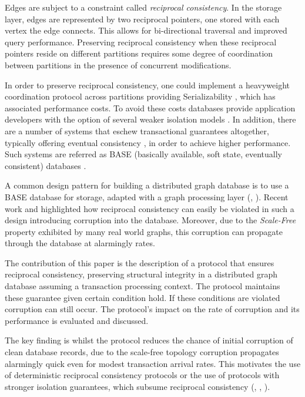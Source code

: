 \documentclass[sigplan,10pt]{acmart}
\begin{document}
Edges are subject to a constraint called \emph{reciprocal consistency}. In the storage layer, edges are represented by two reciprocal pointers, one stored with each vertex the edge connects. This allows for bi-directional traversal and improved query performance. Preserving reciprocal consistency when these reciprocal pointers reside on different partitions requires some degree of coordination between partitions in the presence of concurrent modifications.

In order to preserve reciprocal consistency, one could implement a heavyweight coordination protocol across partitions providing Serializability \cite{Bernstein1987}, which has associated performance costs. To avoid these costs databases provide application developers with the option of several weaker isolation models \cite{Berenson1995}. In addition, there are a number of systems that eschew transactional guarantees altogether, typically offering eventual consistency \cite{Bailis2013}, in order to achieve higher performance. Such systems are referred as  BASE (basically available, soft state, eventually consistent) databases \cite{Pritchett2008}.

A common design pattern for building a distributed graph database is to use a BASE database for storage, adapted with a graph processing layer (\cite{janusgraph}, \cite{TitanDB}). Recent work \cite{Ezhilchelvan2018} and \cite{Webber2019} highlighted how reciprocal consistency can easily be violated in such a design introducing corruption into the database. Moreover, due to the \emph{Scale-Free} \cite{ScaleFree} property exhibited by many real world graphs, this corruption can propagate through the database at alarmingly rates.

The contribution of this paper is the description of a protocol that ensures reciprocal consistency, preserving structural integrity in a distributed graph database assuming a transaction processing context. The protocol maintains these guarantee given certain condition hold. If these conditions are violated corruption can still occur. The protocol's impact on the rate of corruption and its performance is evaluated and discussed.

The key finding is whilst the protocol reduces the chance of initial corruption of clean database records, due to the scale-free topology corruption propagates alarmingly quick even for modest transaction arrival rates. This motivates the use of deterministic reciprocal consistency protocols or the use of protocols with stronger isolation guarantees, which subsume reciprocal consistency (\cite{Bailis2014}, \cite{Berenson1995}, \cite{Bernstein1987}).
\end{document}
